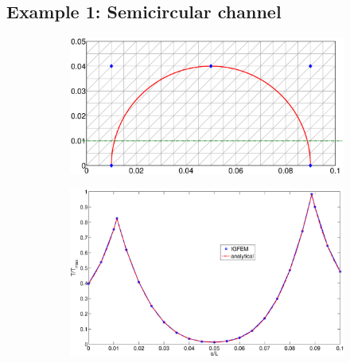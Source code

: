 \documentclass[11pt,letterpaper]{article}
\begin{document}
\subsection{Example 1: Semicircular channel}
\label{subsec_semicircular_example}
\begin{figure}[!h]
\centering
\begin{subfigure}{0.55\textwidth}
\includegraphics[width=\linewidth]{semicircular_channel_w_mesh.eps}
\caption{}
\end{subfigure}

\centering
\begin{subfigure}{0.5\textwidth}
\includegraphics[width=\linewidth]{polyIGFEM_semicircular_T_vs_x_yp01.eps}
\caption{}
\end{subfigure}


\end{figure}
\end{document}
